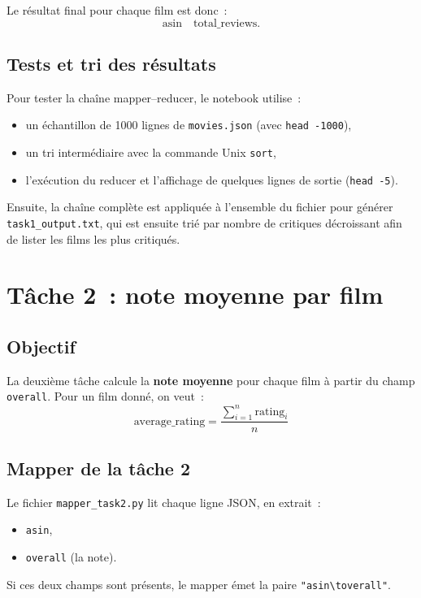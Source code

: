 \documentclass[a4paper,11pt]{article}
\begin{document}
Le résultat final pour chaque film est donc~:
\[\text{asin} \quad \text{total\_reviews}.\]

\subsection{Tests et tri des résultats}

Pour tester la chaîne mapper--reducer, le notebook utilise~:
\begin{itemize}
  \item un échantillon de 1000 lignes de \texttt{movies.json}
        (avec \texttt{head -1000}),\
  \item un tri intermédiaire avec la commande Unix \texttt{sort},\
  \item l'exécution du reducer et l'affichage de quelques lignes
        de sortie (\texttt{head -5}).
\end{itemize}

Ensuite, la chaîne complète est appliquée à l'ensemble du fichier
pour générer \texttt{task1\_output.txt}, qui est ensuite trié
par nombre de critiques décroissant afin de lister les films
les plus critiqués.

\section{Tâche 2~: note moyenne par film}

\subsection{Objectif}

La deuxième tâche calcule la \textbf{note moyenne} pour chaque film
à partir du champ \texttt{overall}. Pour un film donné, on veut~:
\[
  \text{average\_rating} = \frac{\sum_{i=1}^{n} \text{rating}_i}{n}
\]

\subsection{Mapper de la tâche 2}

Le fichier \texttt{mapper\_task2.py} lit chaque ligne JSON, en extrait~:
\begin{itemize}
  \item \texttt{asin},\
  \item \texttt{overall} (la note).
\end{itemize}

Si ces deux champs sont présents, le mapper émet la paire
\texttt{"asin\textbackslash toverall"}.
\end{document}
